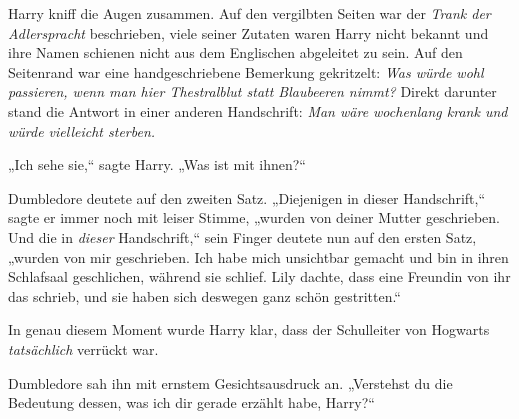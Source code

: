 Harry kniff die Augen zusammen. Auf den vergilbten Seiten war der \emph{Trank der Adlerspracht} beschrieben, viele seiner Zutaten waren Harry nicht bekannt und ihre Namen schienen nicht aus dem Englischen abgeleitet zu sein. Auf den Seitenrand war eine handgeschriebene Bemerkung gekritzelt: \emph{Was würde wohl passieren, wenn man hier Thestralblut statt Blaubeeren nimmt?} Direkt darunter stand die Antwort in einer anderen Handschrift: \emph{Man wäre wochenlang krank und würde vielleicht sterben.}

„Ich sehe sie,“ sagte Harry. „Was ist mit ihnen?“

Dumbledore deutete auf den zweiten Satz. „Diejenigen in dieser Handschrift,“ sagte er immer noch mit leiser Stimme, „wurden von deiner Mutter geschrieben. Und die in \emph{dieser} Handschrift,“ sein Finger deutete nun auf den ersten Satz, „wurden von mir geschrieben. Ich habe mich unsichtbar gemacht und bin in ihren Schlafsaal geschlichen, während sie schlief. Lily dachte, dass eine Freundin von ihr das schrieb, und sie haben sich deswegen ganz schön gestritten.“

In genau diesem Moment wurde Harry klar, dass der Schulleiter von Hogwarts \emph{tatsächlich} verrückt war.

Dumbledore sah ihn mit ernstem Gesichtsausdruck an. „Verstehst du die Bedeutung dessen, was ich dir gerade erzählt habe, Harry?“

